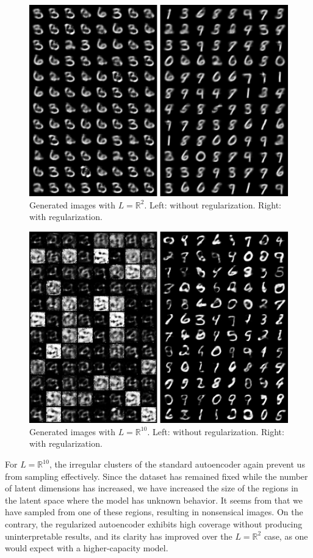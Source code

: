 \documentclass[conference]{IEEEtran}
\newcommand{\R}{\mathbb{R}}
\begin{document}
\begin{figure}[H]
	\centering
	\includegraphics[scale=0.4]{fig/ae-2-comparison.png}
	\caption{Generated images with $L=\R^2$. Left: without regularization. Right: with regularization.}
	\label{ae-2-comparison}
\end{figure}

\begin{figure}[H]
        \centering
        \includegraphics[scale=0.4]{fig/ae-10-comparison.png}
        \caption{Generated images with $L=\R^{10}$. Left: without regularization. Right: with regularization.}
	\label{ae-10-comparison}
\end{figure}

For $L=\R^{10}$, the irregular clusters of the standard autoencoder again prevent us from sampling effectively. Since the dataset has remained fixed while the number of latent dimensions has increased, we have increased the size of the regions in the latent space where the model has unknown behavior. It seems from  that we have sampled from one of these regions, resulting in nonsensical images. On the contrary, the regularized autoencoder exhibits high coverage without producing uninterpretable results, and its clarity has improved over the $L=\R^2$ case, as one would expect with a higher-capacity model.
\end{document}
